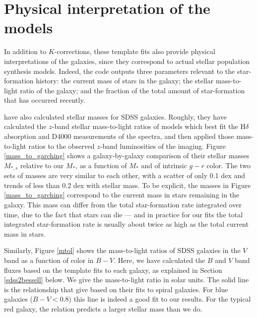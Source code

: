 \documentclass[10pt,preprint]{aastex}
\begin{document}
\section{Physical interpretation of the models}
\label{physical}

In addition to $K$-corrections, these template fits also provide
physical interpretations of the galaxies, since they correspond to
actual stellar population synthesis models. Indeed, the code outputs
three parameters relevant to the star-formation history: the current
mass of stars in the galaxy; the stellar mass-to-light ratio of the
galaxy; and the fraction of the total amount of star-formation that
has occurred recently. 

\citet{kauffmann03a} have also calculated stellar masses for SDSS
galaxies. Roughly, they have calculated the $z$-band stellar
mass-to-light ratios of models which best fit the H$\delta$ absorption
and D4000 measurements of the spectra, and then applied those
mass-to-light ratios to the observed $z$-band luminosities of the
imaging. Figure \ref{mass_to_garching} shows a galaxy-by-galaxy
comparison of their stellar masses $M_{\ast,s}$ relative to our
$M_\ast$, as a function of $M_\ast$ and of intrinsic $g-r$ color. The
two sets of masses are very similar to each other, with a scatter of
only 0.1 dex and trends of less than 0.2 dex with stellar mass.  To be
explicit, the masses in Figure \ref{mass_to_garching} correspond to
the current mass in stars remaining in the galaxy. This mass can
differ from the total star-formation rate integrated over time, due to
the fact that stars can die --- and in practice for our fits the total
integrated star-formation rate is usually about twice as high as the
total current mass in stars.

Similarly, Figure \ref{mtol} shows the mass-to-light ratios of SDSS
galaxies in the $V$ band as a function of color in $B-V$. Here, we
have calculated the $B$ and $V$ band fluxes based on the template fits
to each galaxy, as explained in Section \ref{sdss2bessell} below. We
give the mass-to-light ratio in solar units. The solid line is the
relationship that \citet{bell01b} give based on their fits to spiral
galaxies. For blue galaxies ($B-V < 0.8$) this line is indeed a good
fit to our results. For the typical red galaxy, the \citet{bell01b}
relation predicts a larger stellar mass than we do. 
\end{document}
